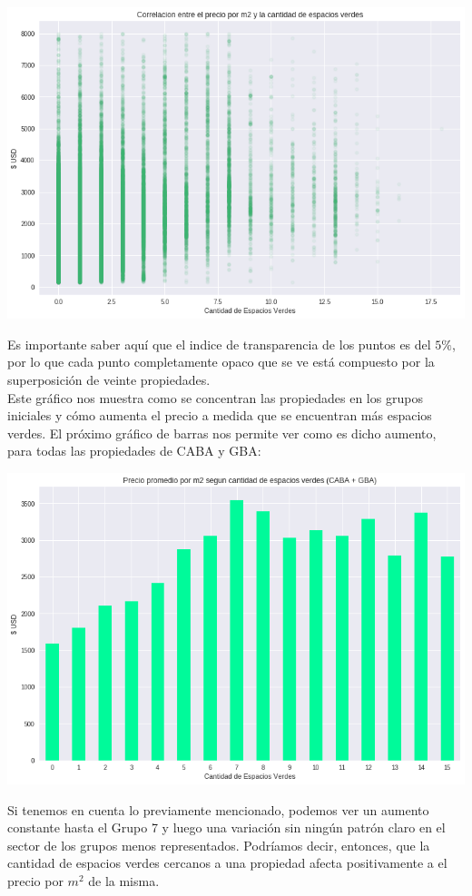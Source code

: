 \documentclass[a4paper, 10pt]{article}
\newcommand\tab[1][0.5cm]{\hspace*{#1}}
\begin{document}
			\begin{center}
				\includegraphics[width=\textwidth]{images/parksScatterM2-CABA-GBA}
			\end{center}
			\tab Es importante saber aquí que el indice de transparencia de los puntos es del $5\%$, por lo que cada punto 
			completamente opaco que se ve está compuesto por la superposición de veinte propiedades. \\
			\tab Este gráfico nos muestra como se concentran las propiedades en los grupos iniciales y cómo aumenta el precio a 
			medida que se encuentran más espacios verdes. El próximo gráfico de barras nos permite ver como es dicho aumento, para
			todas las propiedades de CABA y GBA:
			\begin{center}
				\includegraphics[width=\textwidth]{images/parksM2-CABA-GBA}
			\end{center}
			\tab Si tenemos en cuenta lo previamente mencionado, podemos ver un aumento constante hasta el Grupo 7 y luego una
			variación sin ningún patrón claro en el sector de los grupos menos representados.
			\tab Podríamos decir, entonces, que la cantidad de espacios verdes cercanos a una propiedad afecta positivamente
			a el precio por $m^2$ de la misma.
\end{document}
